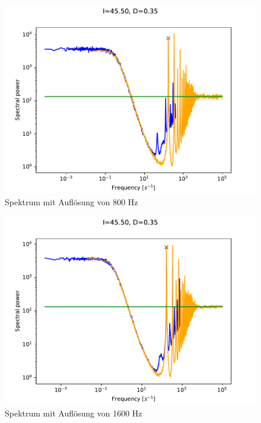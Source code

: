 \documentclass[12pt,a4paper]{article}
\begin{document}
\begin{figure}[H]
	\centering
	\includegraphics[scale=1]{freq800.pdf}\caption{Spektrum mit Auflösung von 800 Hz}
	\label{freq800}
\end{figure}
\begin{figure}[H]
	\centering
	\includegraphics[scale=1]{freq1600.pdf}\caption{Spektrum mit Auflösung von 1600 Hz}
	\label{freq1600}
\end{figure}
\end{document}
